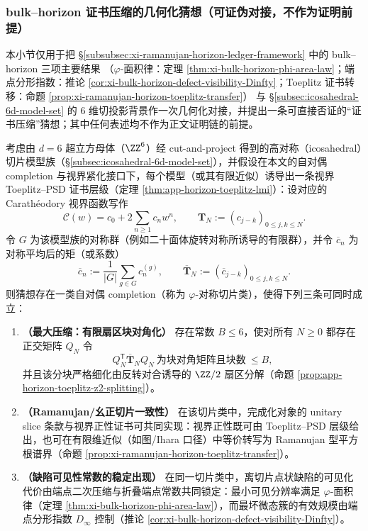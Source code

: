\subsubsection{bulk--horizon 证书压缩的几何化猜想（可证伪对接，不作为证明前提）}\label{subsubsec:discussion-bulk-horizon-certificate-compression}
本小节仅用于把 \S\ref{subsubsec:xi-ramanujan-horizon-ledger-framework} 中的 bulk--horizon 三项主要结果
（\(\varphi\)-面积律：定理 \ref{thm:xi-bulk-horizon-phi-area-law}；端点分形指数：推论 \ref{cor:xi-bulk-horizon-defect-visibility-Dinfty}；Toeplitz 证书转移：命题 \ref{prop:xi-ramanujan-horizon-toeplitz-transfer}）
与 \S\ref{subsec:icosahedral-6d-model-set} 的 \(6\) 维切投影背景作一次几何化对接，并提出一条可直接否证的“证书压缩”猜想；其中任何表述均不作为正文证明链的前提。

\begin{conjecture}\label{conj:discussion-phi-symmetric-slice-extremal}
考虑由 \(d=6\) 超立方母体（\(\ZZ^6\)）经 cut-and-project 得到的高对称（icosahedral）切片模型族（\S\ref{subsec:icosahedral-6d-model-set}），并假设在本文的自对偶 completion 与视界紧化接口下，每个模型（或其有限近似）诱导出一条视界 Toeplitz--PSD 证书层级（定理 \ref{thm:app-horizon-toeplitz-lmi}）：设对应的 Carath\'eodory 视界函数写作
\[
\mathscr{C}(w)=c_0+2\sum_{n\ge 1}c_n w^n,\qquad
\mathbf{T}_N:=(c_{j-k})_{0\le j,k\le N}.
\]
令 \(G\) 为该模型族的对称群（例如二十面体旋转对称所诱导的有限群），并令 \(\overline c_n\) 为对称平均后的矩（或系数）
\[
\overline c_n:=\frac{1}{|G|}\sum_{g\in G} c_n^{(g)},
\qquad
\overline{\mathbf{T}}_N:=(\overline c_{j-k})_{0\le j,k\le N}.
\]
则猜想存在一类自对偶 completion（称为 \(\varphi\)-对称切片类），使得下列三条可同时成立：
\begin{enumerate}
  \item \textbf{（最大压缩：有限扇区块对角化）}
  存在常数 \(B\le 6\)，使对所有 \(N\ge 0\) 都存在正交矩阵 \(Q_N\) 令
  \[
  Q_N^{\mathsf T}\overline{\mathbf{T}}_N Q_N
  \ \text{为块对角矩阵且块数}\ \le B,
  \]
  并且该分块严格细化由反转对合诱导的 \(\ZZ/2\) 扇区分解（命题 \ref{prop:app-horizon-toeplitz-z2-splitting}）。
  \item \textbf{（Ramanujan/幺正切片一致性）}
  在该切片类中，完成化对象的 unitary slice 条款与视界正性证书可共同实现：视界正性既可由 Toeplitz--PSD 层级给出，也可在有限维近似（如图/Ihara 口径）中等价转写为 Ramanujan 型平方根谱界（命题 \ref{prop:xi-ramanujan-horizon-toeplitz-transfer}）。
  \item \textbf{（缺陷可见性常数的稳定出现）}
  在同一切片类中，离切片点状缺陷的可见化代价由端点二次压缩与折叠端点常数共同锁定：最小可见分辨率满足 \(\varphi\)-面积律（定理 \ref{thm:xi-bulk-horizon-phi-area-law}），而最坏微态簇的有效规模由端点分形指数 \(D_\infty\) 控制（推论 \ref{cor:xi-bulk-horizon-defect-visibility-Dinfty}）。
\end{enumerate}
\end{conjecture}

